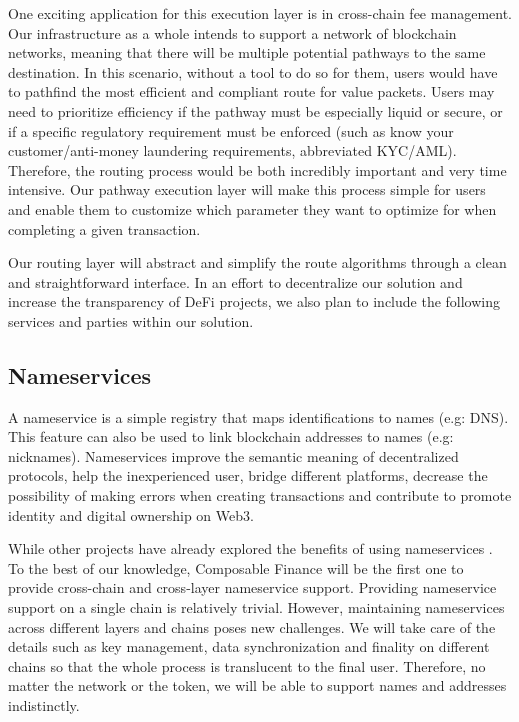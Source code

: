 One exciting application for this execution layer is in cross-chain fee management. Our infrastructure as a whole intends to support a network of blockchain networks, meaning that there will be multiple potential pathways to the same destination. In this scenario, without a tool to do so for them, users would have to pathfind the most efficient and compliant route for value packets. Users may need to prioritize efficiency if the pathway must be especially liquid or secure, or if a specific regulatory requirement must be enforced (such as know your customer/anti-money laundering requirements, abbreviated KYC/AML). Therefore, the routing process would be both incredibly important and very time intensive. Our pathway execution layer will make this process simple for users and enable them to customize which parameter they want to optimize for when completing a given transaction.

Our routing layer will abstract and simplify the route algorithms through a clean and straightforward interface. In an effort to decentralize our solution and increase the transparency of DeFi projects, we also plan to include the following services and parties within our solution.

\subsection{Nameservices}
A nameservice is a simple registry that maps identifications to names (e.g: DNS). This feature can also be used to link blockchain addresses to names (e.g: nicknames). Nameservices improve the semantic meaning of decentralized protocols, help the inexperienced user, bridge different platforms, decrease the possibility of making errors when creating transactions and contribute to promote identity and digital ownership on Web3.

While other projects have already explored the benefits of using nameservices \cite{ProtonchainBlockchain}. To the best of our knowledge, Composable Finance will be the first one to provide cross-chain and cross-layer nameservice support. Providing nameservice support on a single chain is relatively trivial. However, maintaining nameservices across different layers and chains poses new challenges. We will take care of the details such as key management, data synchronization and finality on different chains so that the whole process is translucent to the final user. Therefore, no matter the network or the token, we will be able to support names and addresses indistinctly.

